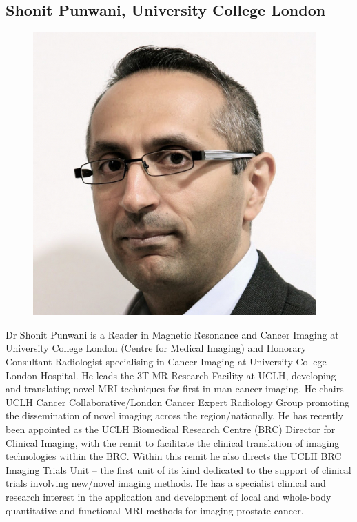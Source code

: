 \documentclass[a5paper,10pt,twoside,onecolumn,openany,helvetica,showtrims]{memoir}
\newlength{\SpeakerSize}
\begin{document}
\begin{vplace}[1]
\section*{Shonit Punwani, University College London}
\begin{figure}
\includegraphics[width=\SpeakerSize]{SpeakerPics/image4}	
\end{figure}
Dr Shonit Punwani is a Reader in Magnetic Resonance and Cancer Imaging at University College London (Centre for Medical Imaging) and Honorary Consultant Radiologist specialising in Cancer Imaging at University College London Hospital. He leads the 3T MR Research Facility at UCLH, developing and translating novel MRI techniques for first-in-man cancer imaging. He chairs UCLH Cancer Collaborative/London Cancer Expert Radiology Group promoting the dissemination of novel imaging across the region/nationally. He has recently been appointed as the UCLH Biomedical Research Centre (BRC) Director for Clinical Imaging, with the remit to facilitate the clinical translation of imaging technologies within the BRC. Within this remit he also directs the UCLH BRC Imaging Trials Unit – the first unit of its kind dedicated to the support of clinical trials involving new/novel imaging methods. He has a specialist clinical and research interest in the application and development of local and whole-body quantitative and functional MRI methods for imaging prostate cancer.
\end{vplace}
\clearpage
\end{document}

